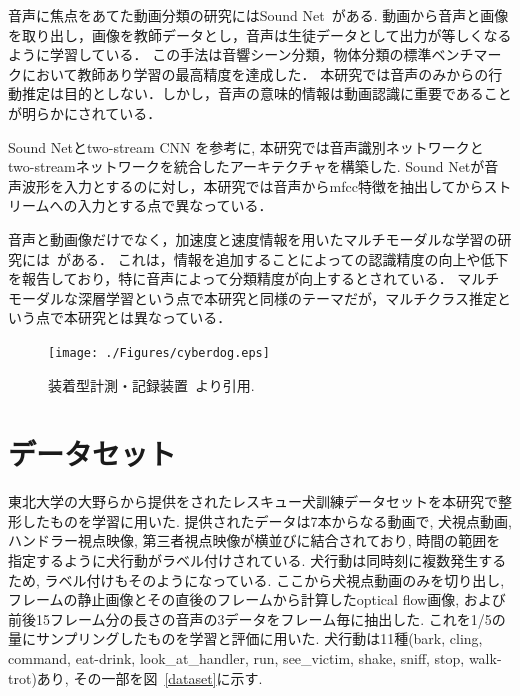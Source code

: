 \documentclass[MIRU,submit]{miru2019j}
\begin{document}
音声に焦点をあてた動画分類の研究にはSound Net~\cite{aytar2016soundnet}がある.
動画から音声と画像を取り出し，画像を教師データとし，音声は生徒データとして出力が等しくなるように学習している．
この手法は音響シーン分類，物体分類の標準ベンチマークにおいて教師あり学習の最高精度を達成した．
本研究では音声のみからの行動推定は目的としない．しかし，音声の意味的情報は動画認識に重要であることが明らかにされている．

Sound Netとtwo-stream CNN を参考に, 本研究では音声識別ネットワークと two-streamネットワークを統合したアーキテクチャを構築した.
Sound Netが音声波形を入力とするのに対し，本研究では音声からmfcc特徴を抽出してからストリームへの入力とする点で異なっている．

音声と動画像だけでなく，加速度と速度情報を用いたマルチモーダルな学習の研究には~\cite{tanno2019deim}がある．
これは，情報を追加することによっての認識精度の向上や低下を報告しており，特に音声によって分類精度が向上するとされている．
マルチモーダルな深層学習という点で本研究と同様のテーマだが，マルチクラス推定という点で本研究とは異なっている．

\begin{figure}[tb]
 \begin{center}
  \texttt{[image: ./Figures/cyberdog.eps]}
  \caption{装着型計測・記録装置~\cite{dog01}より引用.}
  \label{cyber}
 \end{center}
\end{figure}

\section{データセット}
東北大学の大野らから提供をされたレスキュー犬訓練データセットを本研究で整形したものを学習に用いた.
提供されたデータは7本からなる動画で, 犬視点動画, ハンドラー視点映像, 第三者視点映像が横並びに結合されており, 時間の範囲を指定するように犬行動がラベル付けされている.
犬行動は同時刻に複数発生するため, ラベル付けもそのようになっている.
ここから犬視点動画のみを切り出し, フレームの静止画像とその直後のフレームから計算したoptical flow画像, および前後15フレーム分の長さの音声の3データをフレーム毎に抽出した.
これを1/5の量にサンプリングしたものを学習と評価に用いた.
犬行動は11種(bark, cling, command, eat-drink, look\_at\_handler, run, see\_victim, shake, sniff, stop, walk-trot)あり, その一部を図~\ref{dataset}に示す.
\end{document}

